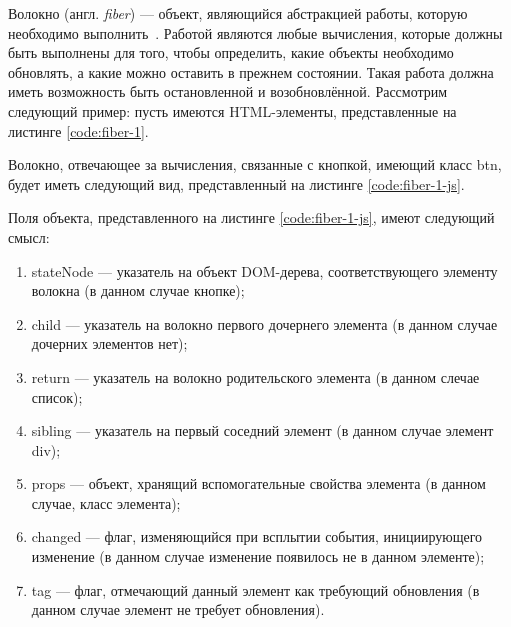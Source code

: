 Волокно (англ. \textit{fiber}) --- объект, являющийся абстракцией работы, которую необходимо выполнить~\cite{react-dive}. Работой являются любые вычисления, которые должны быть выполнены для того, чтобы определить, какие объекты необходимо обновлять, а какие можно оставить в прежнем состоянии. Такая работа должна иметь возможность быть остановленной и возобновлённой. Рассмотрим следующий пример: пусть имеются HTML-элементы, представленные на листинге \ref{code:fiber-1}.


Волокно, отвечающее за вычисления, связанные с кнопкой, имеющий класс btn, будет иметь следующий вид, представленный на листинге \ref{code:fiber-1-js}.


Поля объекта, представленного на листинге \ref{code:fiber-1-js}, имеют следующий смысл:
\begin{enumerate}[label=\arabic*)]
	\item stateNode --- указатель на объект DOM-дерева, соответствующего элементу волокна (в данном случае кнопке);
	\item child --- указатель на волокно первого дочернего элемента (в данном случае дочерних элементов нет);
	\item return --- указатель на волокно родительского элемента (в данном слечае список);
	\item sibling --- указатель на первый соседний элемент (в данном случае элемент div);
	\item props --- объект, хранящий вспомогательные свойства элемента (в данном случае, класс элемента);
	\item changed --- флаг, изменяющийся при всплытии события, инициирующего изменение (в данном случае изменение появилось не в данном элементе);
	\item tag --- флаг, отмечающий данный элемент как требующий обновления (в данном случае элемент не требует обновления).
\end{enumerate}

